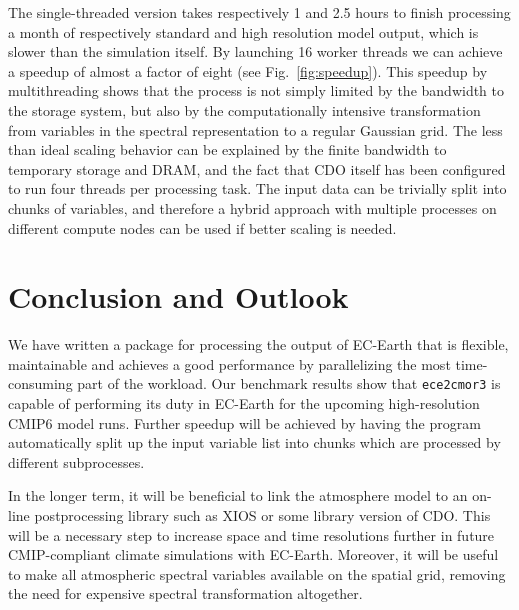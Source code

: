 \documentclass[procedia]{easychair}
\begin{document}
The single-threaded version takes respectively 1 and 2.5 hours to finish 
processing a month of respectively standard and high resolution model output, 
which is slower than the simulation itself. By launching 16 worker threads 
we can achieve a speedup of almost a factor of eight (see 
Fig.~\ref{fig:speedup}). This speedup by multithreading shows that the process 
is not simply limited by the bandwidth to the storage system, but also by the 
computationally intensive transformation from variables in the spectral 
representation to a regular Gaussian grid. The less than ideal scaling 
behavior can be explained by the finite bandwidth to temporary storage and 
DRAM, and the fact that CDO itself has been configured to run four threads per 
processing task. The input data can be trivially split into chunks of 
variables, and therefore a hybrid approach with multiple processes on different 
compute nodes can be used if better scaling is needed.


\section{Conclusion and Outlook}

We have written a package for processing the output of EC-Earth that is 
flexible, maintainable and achieves a good performance by parallelizing the 
most time-consuming part of the workload. Our benchmark results show that 
\texttt{ece2cmor3} is capable of performing its duty in EC-Earth for the 
upcoming high-resolution CMIP6 model runs. Further speedup will be achieved by 
having the program automatically split up the input variable list into chunks 
which are processed by different subprocesses.

In the longer term, it will be beneficial to link the atmosphere model to an 
on-line postprocessing library such as XIOS or some library version of CDO. 
This will be a necessary step to increase space and time resolutions further in 
future CMIP-compliant climate simulations with EC-Earth. Moreover, it will be 
useful to make all atmospheric spectral variables available on the spatial 
grid, removing the need for expensive spectral transformation altogether.


%
\label{sect:bib}

%
%
%


\end{document}
